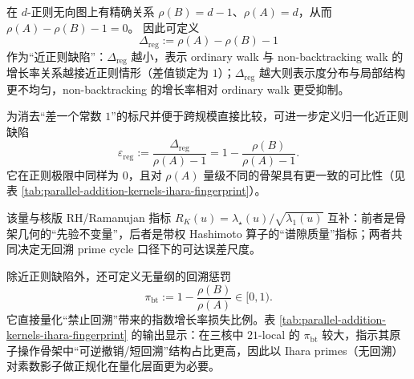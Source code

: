 \begin{remark}\label{rem:ihara-delta-reg}
在 $d$-正则无向图上有精确关系 \(\rho(B)=d-1\)、\(\rho(A)=d\)，从而 \(\rho(A)-\rho(B)-1=0\)。
因此可定义
$$
\Delta_{\mathrm{reg}}:=\rho(A)-\rho(B)-1
$$
作为“近正则缺陷”：\(\Delta_{\mathrm{reg}}\) 越小，表示 ordinary walk 与 non-backtracking walk 的增长率关系越接近正则情形（差值锁定为 \(1\)）；\(\Delta_{\mathrm{reg}}\) 越大则表示度分布与局部结构更不均匀，non-backtracking 的增长率相对 ordinary walk 更受抑制。

为消去“差一个常数 \(1\)”的标尺并便于跨规模直接比较，可进一步定义归一化近正则缺陷
\[
\varepsilon_{\mathrm{reg}}
:=\frac{\Delta_{\mathrm{reg}}}{\rho(A)-1}
=1-\frac{\rho(B)}{\rho(A)-1}.
\]
它在正则极限中同样为 \(0\)，且对 \(\rho(A)\) 量级不同的骨架具有更一致的可比性（见表 \ref{tab:parallel-addition-kernels-ihara-fingerprint}）。

该量与核版 RH/Ramanujan 指标 \(R_K(u)=\lambda_\star(u)/\sqrt{\lambda_1(u)}\) 互补：前者是骨架几何的“先验不变量”，后者是带权 Hashimoto 算子的“谱隙质量”指标；两者共同决定无回溯 prime cycle 口径下的可达误差尺度。
\end{remark}

\begin{remark}\label{rem:ihara-pi-bt}
除近正则缺陷外，还可定义无量纲的回溯惩罚
$$
\pi_{\mathrm{bt}}:=1-\frac{\rho(B)}{\rho(A)}\in[0,1).
$$
它直接量化“禁止回溯”带来的指数增长率损失比例。表 \ref{tab:parallel-addition-kernels-ihara-fingerprint} 的输出显示：在三核中 \(21\)-local 的 \(\pi_{\mathrm{bt}}\) 较大，指示其原子操作骨架中“可逆撤销/短回溯”结构占比更高，因此以 Ihara primes（无回溯）对素数影子做正规化在量化层面更为必要。
\end{remark}

